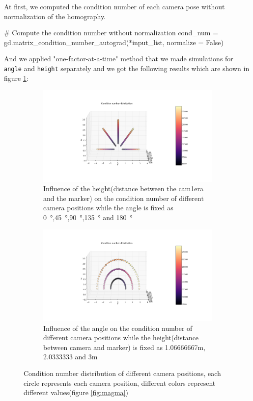 At first, we computed the condition number of each camera pose without normalization of the homography.

\begin{python}
# Compute the condition number without normalization
cond_num = gd.matrix_condition_number_autograd(*input_list, normalize = False)
\end{python} 

And we applied "one-factor-at-a-time" method that we made simulations for \texttt{angle} and \texttt{height} separately and we got the following results which are shown in figure \ref{fig:angle_height}: 

\begin{figure}[H]
  \centering
  \begin{subfigure}[b]{1.0\textwidth}
    \includegraphics[width=\textwidth]{./fig/only_height.png}
    \caption{Influence of the height(distance between the cam1era and the marker) on the condition number of different camera positions while the angle is fixed as \SI{0}{\degree},\SI{45}{\degree},\SI{90}{\degree},\SI{135}{\degree} and \SI{180}{\degree}}
  \end{subfigure}
  \begin{subfigure}[b]{1.0\textwidth}
    \includegraphics[width=\textwidth]{./fig/only_angle.png}
    \caption{Influence of the angle on the condition number of different camera positions while the height(distance between camera and marker) is fixed as 1.06666667m, 2.0333333 and 3m}
  \end{subfigure}
  \caption{Condition number distribution of different camera positions, each circle represents each camera position, different colors represent different values(figure \ref{fig:magma})}
  \label{fig:angle_height}
\end{figure}

